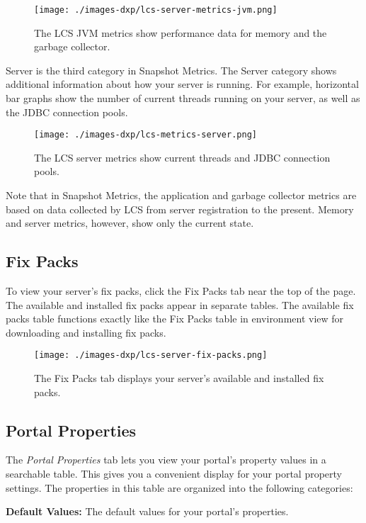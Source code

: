 \begin{figure}
\centering
\texttt{[image: ./images-dxp/lcs-server-metrics-jvm.png]}
\caption{The LCS JVM metrics show performance data for memory and the
garbage collector.}
\end{figure}

Server is the third category in Snapshot Metrics. The Server category
shows additional information about how your server is running. For
example, horizontal bar graphs show the number of current threads
running on your server, as well as the JDBC connection pools.

\begin{figure}
\centering
\texttt{[image: ./images-dxp/lcs-metrics-server.png]}
\caption{The LCS server metrics show current threads and JDBC connection
pools.}
\end{figure}

Note that in Snapshot Metrics, the application and garbage collector
metrics are based on data collected by LCS from server registration to
the present. Memory and server metrics, however, show only the current
state.

\subsection{Fix Packs}\label{fix-packs-1}

To view your server's fix packs, click the Fix Packs tab near the top of
the page. The available and installed fix packs appear in separate
tables. The available fix packs table functions exactly like the Fix
Packs table in environment view for downloading and installing fix
packs.

\begin{figure}
\centering
\texttt{[image: ./images-dxp/lcs-server-fix-packs.png]}
\caption{The Fix Packs tab displays your server's available and
installed fix packs.}
\end{figure}

\subsection{Portal Properties}\label{portal-properties}

The \emph{Portal Properties} tab lets you view your portal's property
values in a searchable table. This gives you a convenient display for
your portal property settings. The properties in this table are
organized into the following categories:

\textbf{Default Values:} The default values for your portal's
properties.

